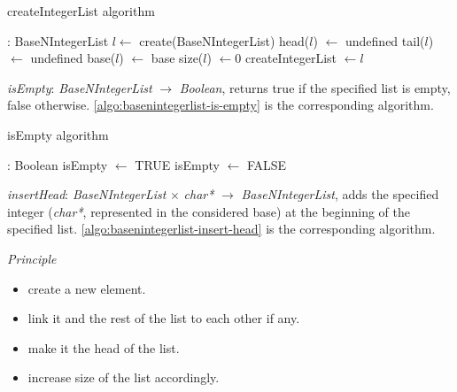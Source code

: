 \documentclass[book, nodocumentinfo]{upmethodology-document}
\begin{document}
\begin{algorithm}[H]
    \label{algo:basenintegerlist-create-integer-list}
    \caption{createIntegerList algorithm}

    \begin{algorithmic}
         : BaseNIntegerList
            \State \(l \leftarrow\) create(BaseNIntegerList)
            \State head(\(l\)) \(\leftarrow\) undefined
            \State tail(\(l\)) \(\leftarrow\) undefined
            \State base(\(l\)) \(\leftarrow\) base
            \State size(\(l\)) \(\leftarrow 0\)
            \State createIntegerList \(\leftarrow l\)
        \EndFunction
    \end{algorithmic}
\end{algorithm}


\emph{isEmpty}: \emph{BaseNIntegerList} \(\rightarrow\) \emph{Boolean},
returns true if the specified list is empty, false otherwise.
\ref{algo:basenintegerlist-is-empty} is the corresponding algorithm.

\begin{algorithm}[H]
    \label{algo:basenintegerlist-is-empty}
    \caption{isEmpty algorithm}

    \begin{algorithmic}
         : Boolean
                \State isEmpty \(\leftarrow\) TRUE
            \Else
                \State isEmpty \(\leftarrow\) FALSE
            \EndIf
        \EndFunction
    \end{algorithmic}
\end{algorithm}


\emph{insertHead}: \emph{BaseNIntegerList} \(\times\) \emph{char*} \(\rightarrow\) \emph{BaseNIntegerList},
adds the specified integer (\emph{char*}, represented in the considered base) at the beginning
of the specified list.
\ref{algo:basenintegerlist-insert-head} is the corresponding algorithm.

\emph{Principle}
\begin{itemize}
    \item create a new element.
    \item link it and the rest of the list to each other if any.
    \item make it the head of the list.
    \item increase size of the list accordingly.
\end{itemize}
\end{document}
